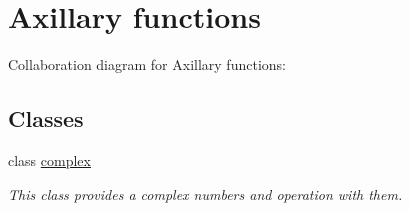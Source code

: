 \hypertarget{group___ax_func}{}\section{Axillary functions}
\label{group___ax_func}
Collaboration diagram for Axillary functions\+:
\subsection*{Classes}
\begin{DoxyCompactItemize}
\item 
class \mbox{\hyperlink{classcomplex}{complex}}
\begin{DoxyCompactList}\small\item\em This class provides a complex numbers and operation with them. \end{DoxyCompactList}\end{DoxyCompactItemize}
